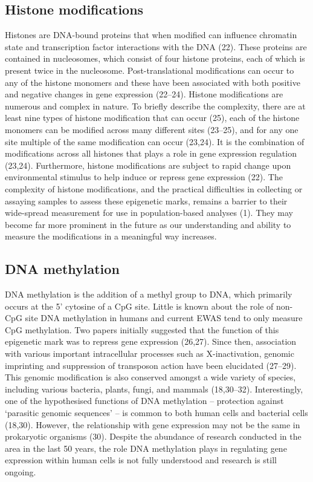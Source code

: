 \documentclass[11pt,oneside]{bristolthesis}
\begin{document}
\hypertarget{histone-modifications}{%
\subsection{Histone modifications}\label{histone-modifications}}

Histones are DNA-bound proteins that when modified can influence chromatin state and transcription factor interactions with the DNA (22). These proteins are contained in nucleosomes, which consist of four histone proteins, each of which is present twice in the nucleosome. Post-translational modifications can occur to any of the histone monomers and these have been associated with both positive and negative changes in gene expression (22--24). Histone modifications are numerous and complex in nature. To briefly describe the complexity, there are at least nine types of histone modification that can occur (25), each of the histone monomers can be modified across many different sites (23--25), and for any one site multiple of the same modification can occur (23,24). It is the combination of modifications across all histones that plays a role in gene expression regulation (23,24). Furthermore, histone modifications are subject to rapid change upon environmental stimulus to help induce or repress gene expression (22). The complexity of histone modifications, and the practical difficulties in collecting or assaying samples to assess these epigenetic marks, remains a barrier to their wide-spread measurement for use in population-based analyses (1). They may become far more prominent in the future as our understanding and ability to measure the modifications in a meaningful way increases.

\hypertarget{dna-methylation}{%
\subsection{DNA methylation}\label{dna-methylation}}

DNA methylation is the addition of a methyl group to DNA, which primarily occurs at the 5' cytosine of a CpG site. Little is known about the role of non-CpG site DNA methylation in humans and current EWAS tend to only measure CpG methylation. Two papers initially suggested that the function of this epigenetic mark was to repress gene expression (26,27). Since then, association with various important intracellular processes such as X-inactivation, genomic imprinting and suppression of transposon action have been elucidated (27--29). This genomic modification is also conserved amongst a wide variety of species, including various bacteria, plants, fungi, and mammals (18,30--32). Interestingly, one of the hypothesised functions of DNA methylation -- protection against `parasitic genomic sequences' -- is common to both human cells and bacterial cells (18,30). However, the relationship with gene expression may not be the same in prokaryotic organisms (30). Despite the abundance of research conducted in the area in the last 50 years, the role DNA methylation plays in regulating gene expression within human cells is not fully understood and research is still ongoing.
\end{document}
